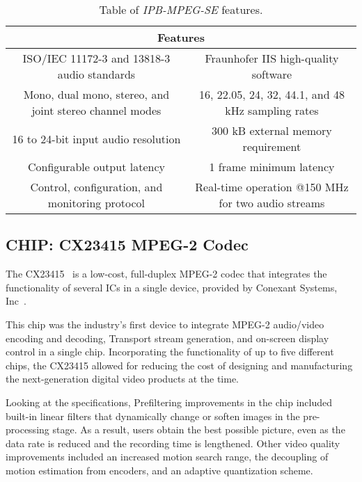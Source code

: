 \begin{table}[h]
    \centering
    \begin{tabular}{|c|c|}
        \hline
        \multicolumn{2}{|c|}{\textbf{Features}} \\
        \hline
         ISO/IEC 11172-3 and 13818-3 audio standards & Fraunhofer IIS high-quality software \\
         \hline
         Mono, dual mono, stereo, and joint stereo channel modes & 16, 22.05, 24, 32, 44.1, and 48 kHz sampling rates \\
         \hline
         16 to 24-bit input audio resolution & 300 kB external memory requirement\\
         \hline
         Configurable output latency & 1 frame minimum latency\\
         \hline
         Control, configuration, and monitoring protocol & Real-time operation @150 MHz for two audio streams\\
         \hline
    \end{tabular}
    \caption{Table of \textit{IPB-MPEG-SE} features.}
    \label{tab:ipbloq}
\end{table}

\subsection{CHIP: CX23415 MPEG-2 Codec}

The CX23415~\cite{cx23415} is a low-cost, full-duplex MPEG-2 codec that integrates the functionality of several ICs in a single device, provided by Conexant Systems, Inc~\cite{conexant}.

This chip was the industry's first device to integrate MPEG-2 audio/video encoding and decoding, Transport stream generation, and on-screen display control in a single chip. Incorporating the functionality of up to five different chips, the CX23415 allowed for reducing the cost of designing and manufacturing the next-generation digital video products at the time.

Looking at the specifications, Prefiltering improvements in the chip included built-in linear filters that dynamically change or soften images in the pre-processing stage. As a result, users obtain the best possible picture, even as the data rate is reduced and the recording time is lengthened. Other video quality improvements included an increased motion search range, the decoupling of motion estimation from encoders, and an adaptive quantization scheme. 

